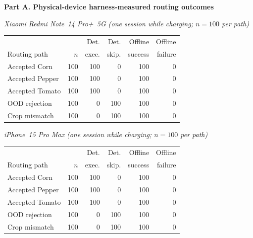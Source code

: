 
\noindent\textbf{Part A. Physical-device harness-measured routing outcomes}

\smallskip
\noindent\textit{Xiaomi Redmi Note~14 Pro+~5G (one session while charging;
$n = 100$ per path)}

\begin{center}\footnotesize\setlength{\tabcolsep}{5pt}
\begin{tabular}{p{115pt} r r r r r}
\toprule
             &     & Det.  & Det.  & Offline & Offline \\
Routing path & $n$ & exec. & skip. & success & failure \\
\midrule
Accepted Corn        & 100 & 100 & 0   & 100 & 0 \\
Accepted Pepper      & 100 & 100 & 0   & 100 & 0 \\
Accepted Tomato      & 100 & 100 & 0   & 100 & 0 \\
OOD rejection        & 100 & 0   & 100 & 100 & 0 \\
Crop mismatch        & 100 & 0   & 100 & 100 & 0 \\
\bottomrule
\end{tabular}\end{center}

\smallskip
\noindent\textit{iPhone~15 Pro Max (one session while charging; $n = 100$
per path)}

\begin{center}\footnotesize\setlength{\tabcolsep}{5pt}
\begin{tabular}{p{115pt} r r r r r}
\toprule
             &     & Det.  & Det.  & Offline & Offline \\
Routing path & $n$ & exec. & skip. & success & failure \\
\midrule
Accepted Corn        & 100 & 100 & 0   & 100 & 0 \\
Accepted Pepper      & 100 & 100 & 0   & 100 & 0 \\
Accepted Tomato      & 100 & 100 & 0   & 100 & 0 \\
OOD rejection        & 100 & 0   & 100 & 100 & 0 \\
Crop mismatch        & 100 & 0   & 100 & 100 & 0 \\
\bottomrule
\end{tabular}\end{center}

